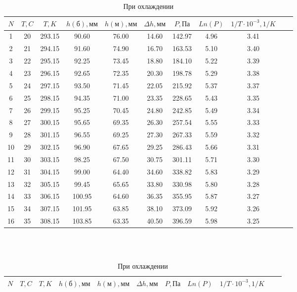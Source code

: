 \begin{center}
\begin{table}[h]
		\caption{При нагреве}
\begin{tabular}{|c|c|c|c|c|c|c|c|c|c|c|} \hline
$N$ & $T, C$ & $T, K$ & $h(\text{б}), \text{мм}$ & $h(\text{м}), \text{мм}$ & $\Delta h, \text{мм}$ & $P, Па$ & $Ln(P)$ & $1/T\cdot10^{-3}, 1/K$ \\ \hline
 1 & 20 & 293.15 &  90.60 & 76.00 & 14.60 & 142.97 & 4.96 & 3.41  \\ \hline
 2 & 21 & 294.15 &  91.60 & 74.90 & 16.70 & 163.53 & 5.10 & 3.40  \\ \hline 
 3 & 22 & 295.15 &  92.25 & 73.45 & 18.80 & 184.10 & 5.22 & 3.39  \\ \hline
 4 & 23 & 296.15 &  92.65 & 72.35 & 20.30 & 198.78 & 5.29 & 3.38  \\ \hline
 5 & 24 & 297.15 &  93.50 & 71.45 & 22.05 & 215.92 & 5.37 & 3.37  \\ \hline
 6 & 25 & 298.15 &  94.35 & 71.00 & 23.35 & 228.65 & 5.43 & 3.35  \\ \hline
 7 & 26 & 299.15 &  95.25 & 70.45 & 24.80 & 242.85 & 5.49 & 3.34  \\ \hline
 8 & 27 & 300.15 &  95.65 & 69.35 & 26.30 & 257.54 & 5.55 & 3.33  \\ \hline
 9 & 28 & 301.15 &  96.55 & 69.25 & 27.30 & 267.33 & 5.59 & 3.32  \\ \hline
10 & 29 & 302.15 &  96.90 & 67.65 & 29.25 & 286.43 & 5.66 & 3.31  \\ \hline
11 & 30 & 303.15 &  98.25 & 67.50 & 30.75 & 301.11 & 5.71 & 3.30  \\ \hline
12 & 31 & 304.15 &  99.00 & 64.40 & 34.60 & 338.82 & 5.83 & 3.29  \\ \hline
13 & 32 & 305.15 &  99.45 & 65.65 & 33.80 & 330.98 & 5.80 & 3.28  \\ \hline
14 & 33 & 306.15 & 100.95 & 64.60 & 36.35 & 355.95 & 5.87 & 3.27  \\ \hline
15 & 34 & 307.15 & 101.95 & 63.85 & 38.10 & 373.09 & 5.92 & 3.26  \\ \hline
16 & 35 & 308.15 & 103.85 & 63.35 & 40.50 & 396.59 & 5.98 & 3.25  \\ \hline
\end{tabular}\\\\
	\caption{При охлаждении}
\begin{tabular}{|c|c|c|c|c|c|c|c|c|c|c|} \hline
$N$ & $T, C$ & $T, K$ & $h(\text{б}), \text{мм}$ & $h(\text{м}), \text{мм}$ & $\Delta h, \text{мм}$ & $P, Па$ & $Ln(P)$ & $1/T\cdot10^{-3}, 1/K$ \\ \hline

\end{tabular}
\end{table}
\end{center}
